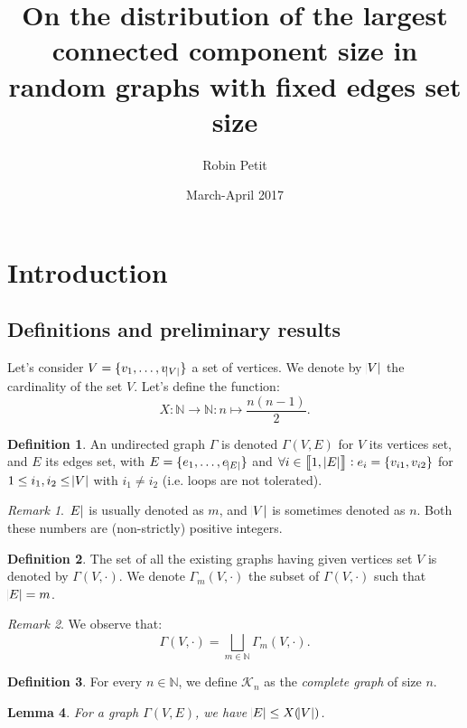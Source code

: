 \documentclass{article}
\author{Robin Petit}
\date{March-April 2017}
\title{On the distribution of the largest connected component size in random graphs with fixed edges set size}
\newtheorem{lemma}{Lemma}[section]
\theoremstyle{definition}
\newtheorem{definition}[lemma]{Definition}
\theoremstyle{remark}
\newtheorem*{remark}{Remark}
\newcommand{\N}{\mathbb N}
\newcommand{\intint}[2]{\left\llbracket#1, \, #2\right\rrbracket}
\begin{document}
\maketitle
\tableofcontents

\section{Introduction}
	\subsection{Definitions and preliminary results}
		Let's consider $V = \{v_1, \ldots, v_{\abs V}\}$ a set of vertices. We denote by $\abs V$ the cardinality of the set $V$. Let's define
		the function:
		\[X : \N \to \N : n \mapsto \frac {n(n-1)}2.\]

		\begin{definition} An undirected graph $\Gamma$ is denoted $\Gamma(V, E)$ for $V$ its vertices set, and $E$ its edges set, with $E = \{e_1, \ldots, e_{\abs E}\}$
		and $\forall i \in \intint 1{\abs E} : e_i = \{v_{i1}, v_{i2}\}$ for $1 \leq i_1, i_2 \leq \abs V$ with $i_1 \neq i_2$ (i.e. loops are not tolerated).
		\end{definition}

		\begin{remark} $\abs E$ is usually denoted as $m$, and $\abs V$ is sometimes denoted as $n$. Both these numbers are (non-strictly) positive integers.
		\end{remark}

		\begin{definition} The set of all the existing graphs having given vertices set $V$ is denoted by $\Gamma(V, \cdot)$. We denote $\Gamma_m(V, \cdot)$
		the subset of $\Gamma(V, \cdot)$ such that $\abs E = m$.
		\end{definition}

		\begin{remark} We observe that:
		\[\Gamma(V, \cdot) = \bigsqcup_{m \in \N}\Gamma_m(V, \cdot).\]
		\end{remark}

		\begin{definition} For every $n \in \N$, we define $\mathcal K_n$ as the \textit{complete graph} of size $n$.
		\end{definition}

		\begin{lemma} For a graph $\Gamma(V, E)$, we have $\abs E \leq X(\abs V)$.
		\end{lemma}
\end{document}
